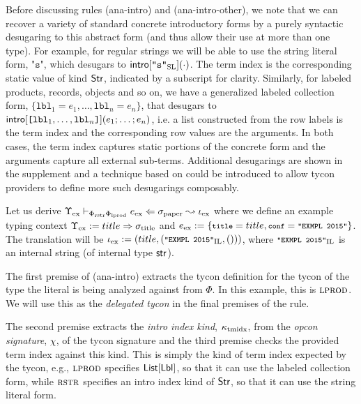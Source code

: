 \documentclass[10pt,preprint]{sigplanconf}
\begin{document}
Before discussing rules (ana-intro) and (ana-intro-other), we note that we can recover a variety of standard concrete introductory forms by a purely syntactic desugaring to this abstract form (and thus allow their use at more than one type). For example, for regular strings we will be able to use the string literal form, $\texttt{"s"}$, which desugars to ${\sf intro}[\texttt{"s"}_\text{SL}](\cdot)$. The term index is the corresponding static value of kind ${\sf Str}$, indicated by a subscript for clarity. Similarly, for labeled products, records, objects and so on, we have a generalized labeled collection form, $\{\mathtt{lbl}_1=e_1, \ldots, \mathtt{lbl}_n=e_n\}$, that desugars to ${\sf intro}[\texttt{[}\mathtt{lbl}_1, \ldots, \mathtt{lbl}_n\texttt{]}](e_1; \ldots; e_n)$, i.e. a list constructed from the row labels is the term index and the corresponding row values are the arguments. In both cases, the term index captures  static portions of the concrete form and the arguments capture all external sub-terms. Additional desugarings are shown in the supplement and a technique based on \cite{TSLs} could be introduced to allow tycon providers to define more such desugarings  composably. 




Let us derive $\small\eana{\Upsilon_\text{ex}}{\Phi_\text{rstr}\Phi_\text{lprod}}{e_\text{ex}}{\stx{paper}}{\iota_\text{ex}}$ where we define an example typing context $\small\Upsilon_\text{ex}  := title \Rightarrow \stx{title}$ and $\small e_\text{ex} := \{\conclbl{title}=title, \conclbl{conf}=\texttt{"EXMPL 2015"}\}$. The  translation will be $\small\iota_\text{ex} := (title, (\texttt{"EXMPL 2015"}_\text{IL}, ()))$, where $\small\texttt{"EXMPL 2015"}_\text{IL}$ is an internal string (of internal type ${\sf str}$). 

The first premise of (ana-intro) extracts the tycon definition for the tycon of the type the literal is being analyzed against from $\Phi$. In this example, this is $\textsc{lprod}$. We will use this as the \emph{delegated tycon} in the final premises of the rule.

The second premise extracts the \emph{intro index kind}, $\kappa_\text{tmidx}$, from the \emph{opcon signature}, $\chi$, of the tycon signature and the third premise checks the provided term index against this kind. This is simply the kind of term index expected by the tycon, e.g., $\textsc{lprod}$ specifies ${\sf List}[{\sf Lbl}]$, so that it can use the labeled collection form, while $\textsc{rstr}$ specifies an intro index kind of ${\sf Str}$, so that it can use the string literal form. %
\end{document}
